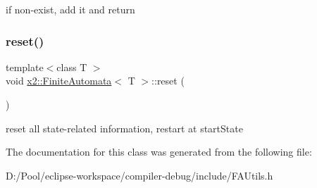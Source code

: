if non-\/exist, add it and return \mbox{\label{classx2_1_1_finite_automata_ab645c9a82ae95bda44e60dce1568bcad}} 
\subsubsection{\texorpdfstring{reset()}{reset()}}
{\footnotesize\ttfamily template$<$class T $>$ \\
void \hyperlink{classx2_1_1_finite_automata}{x2\+::\+Finite\+Automata}$<$ T $>$\+::reset (\begin{DoxyParamCaption}{ }\end{DoxyParamCaption})\hspace{0.3cm}{\ttfamily [inline]}}

reset all state-\/related information, restart at start\+State 

The documentation for this class was generated from the following file\+:\begin{DoxyCompactItemize}
\item 
D\+:/\+Pool/eclipse-\/workspace/compiler-\/debug/include/F\+A\+Utils.\+h\end{DoxyCompactItemize}
